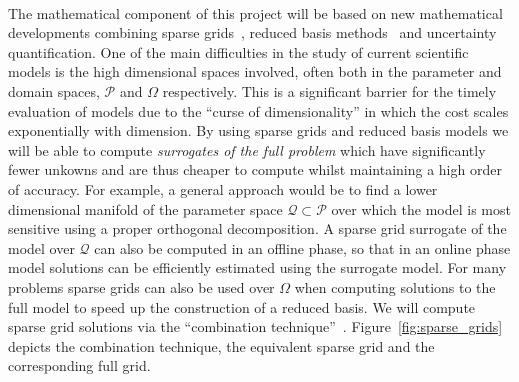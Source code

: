 \documentclass[a4paper,fontsize=13pt]{scrartcl}
\begin{document}





\\

The mathematical component of this project will be based on new
mathematical developments combining sparse grids~\parencite{BungartzGriebel2004}, 
reduced basis methods~\parencite{LiebermanEtal2010,Peherstorfer2013,ChenSchwab2015,PeherstorferWillcox2015}
and uncertainty quantification. 
One of the main difficulties in the study of current scientific models is
the high dimensional spaces involved, often both in the parameter and
domain spaces, $\mathcal{P}$ and $\Omega$ respectively. 
This is a significant barrier for the timely evaluation of models due to the 
``curse of dimensionality'' in which the cost scales exponentially with dimension.
By using sparse grids and reduced basis models we will be able to compute
{\em surrogates of the full problem} which have significantly fewer unkowns and 
are thus cheaper to compute whilst maintaining a high order of accuracy.
For example, a general approach would be to find a lower dimensional manifold 
of the parameter space $\mathcal{Q}\subset\mathcal{P}$ over which the 
model is most sensitive using a proper orthogonal decomposition.
A sparse grid surrogate of the model over $\mathcal{Q}$ can also be 
computed in an offline phase, so that in an online phase model solutions
can be efficiently estimated using the surrogate model.
For many problems sparse grids can also be used over $\Omega$ when  
computing solutions to the full model to speed up the construction of a reduced basis.
We will compute sparse grid solutions via the
``combination technique''~\parencite{Griebel1990}. 
Figure~\ref{fig:sparse_grids} depicts the combination technique, the
equivalent sparse grid and the corresponding full grid. 
\end{document}
